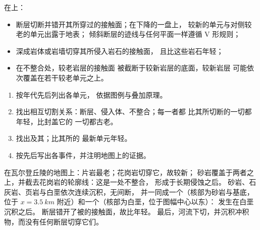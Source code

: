 \begin{proposition}[断层、侵入体与不整合]\label{prop:b1:geological-maps:cuts}
在上：
\begin{itemize}
  \item 断层切断并错开其所穿过的接触面；在下降的一盘上，
        较新的单元与对侧较老的单元出露于地表；
        倾斜断层的迹线与任何平面一样遵循 V 形规则；
  \item 深成岩体或岩墙切穿其所侵入岩石的接触面，
        且比这些岩石年轻；
  \item 在不整合处，较老岩层的接触面
        被截断于较新岩层的底面，较新岩层
        可能依次覆盖在若干较老单元之上。
\end{itemize}
\end{proposition}

\begin{method}[从地质图读取历史]\label{met:b1:geological-maps:history}
\begin{enumerate}
  \item 按年代先后列出各单元，
        依据图例与叠加原理。
  \item 找出相互切割关系：断层、侵入体、不整合；每一者都
        比其所切断的一切都年轻，比封盖它的
        一切都古老。
  \item 找出及其；比其所的
        最新单元年轻。
  \item 按先后写出各事件，并注明地图上的证据。
\end{enumerate}
\end{method}

\begin{example}[瓦尔登丘陵的历史]\label{ex:b1:geological-maps:history}
在瓦尔登丘陵的地图上：片岩最老；花岗岩切穿它，故较新；
砂岩覆盖于两者之上，并截去花岗岩的轮廓线：这是一处不整合，
形成于长期侵蚀之后。
砂岩、石灰岩、页岩与白垩依次连续沉积，无间断，
并一同成一个（核部为砂岩与基底，位于
$x = \qty{3.5}{km}$ 附近）和一个（核部为白垩，位于图幅中心以东）：
发生在白垩沉积之后。
断层错开了被的接触面，故比年轻。
最后，河流下切，并沉积冲积物，而没有任何断层切穿它们。
\end{example}

